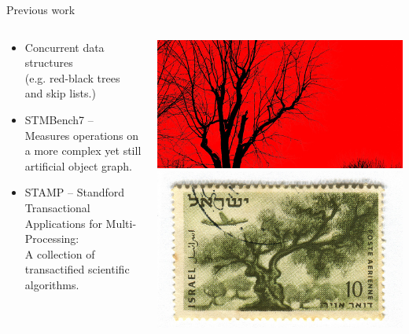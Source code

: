 \documentclass[]{beamer}
\begin{document}
\begin{frame}{Previous work}
\begin{columns}[T]
\begin{column}{8cm}
\begin{itemize}
\item Concurrent data structures \\ (e.g. red-black trees and skip lists.)
\item STMBench7 -- Measures operations on a more complex yet still artificial
      object graph. 
\item STAMP -- Standford Transactional Applications for Multi-Processing:\\
      A collection of transactified scientific algorithms.
\end{itemize}
\end{column}
\begin{column}{3cm}
\vspace{0.2cm}
  \includegraphics[width=\textwidth]{red-black-tree.jpg}
\vspace{0.2cm}
  \includegraphics[width=\textwidth]{stamp.jpg}
\end{column}

\end{columns}
\end{frame}
\end{document}
